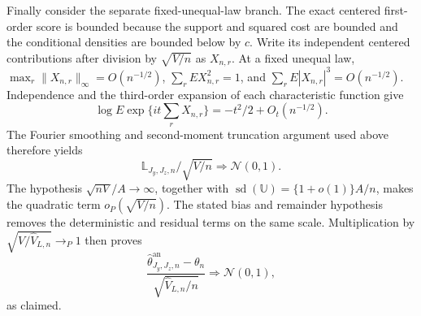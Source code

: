 Finally consider the separate fixed-unequal-law branch.  The exact centered first-order score is bounded because the support and squared cost are bounded and the conditional densities are bounded below by \(c\).  Write its independent centered contributions after division by \(\sqrt{V/n}\) as \(X_{n,r}\).  At a fixed unequal law, \(\max_r\|X_{n,r}\|_\infty=O(n^{-1/2})\), \(\sum_rEX_{n,r}^2=1\), and \(\sum_rE|X_{n,r}|^3=O(n^{-1/2})\).  Independence and the third-order expansion of each characteristic function give
\[
\log E\exp\{it\sum_rX_{n,r}\}=-t^2/2+O_t(n^{-1/2}).
\]
The Fourier smoothing and second-moment truncation argument used above therefore yields
\[
\mathbb L_{J_y,J_z,n}/\sqrt{V/n}\Rightarrow\mathcal N(0,1).
\]
The hypothesis \(\sqrt{nV}/A\to\infty\), together with \(\operatorname{sd}(\mathbb U)=\{1+o(1)\}A/n\), makes the quadratic term \(o_P(\sqrt{V/n})\).  The stated bias and remainder hypothesis removes the deterministic and residual terms on the same scale.  Multiplication by \(\sqrt{V/\widehat V_{L,n}}\to_P1\) then proves
\[
\frac{\widehat\theta^{\mathrm{an}}_{J_y,J_z,n}-\theta_n}
{\sqrt{\widehat V_{L,n}/n}}\Rightarrow\mathcal N(0,1),
\]
as claimed.